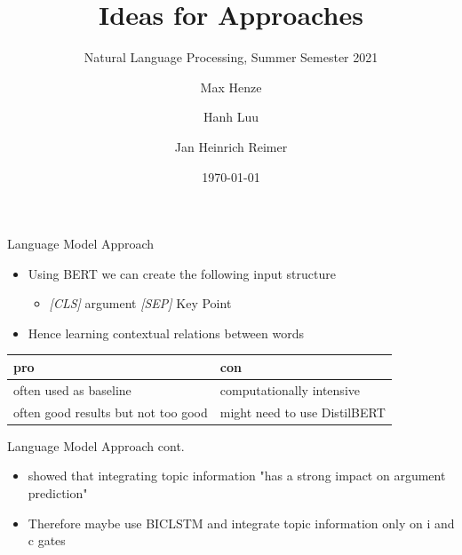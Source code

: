 \documentclass[english,handout]{mlutalk}
\title{Ideas for Approaches}
\subtitle{Natural Language Processing, Summer Semester 2021}
\author{Max Henze \and Hanh Luu \and Jan Heinrich Reimer}
\institute{Martin Luther University Halle-Wittenberg}
\date{\today}
\begin{document}
\titleframe


\begin{frame}{Language Model Approach}
  
  \begin{itemize}
    \item Using BERT we can create the following input structure\\
      \begin{itemize}
        \item \textit{[CLS]} argument \textit{[SEP]} Key Point
      \end{itemize}
    \item Hence learning contextual relations between words
  \end{itemize}

  \begin{tabular}{ll}
    \toprule
      pro & con \\
    \midrule
      often used as baseline & computationally intensive \\
      often good results but not too good & might need to use DistilBERT\\
    \bottomrule
  \end{tabular}

\end{frame}

\begin{frame}{Language Model Approach cont.}
  
    \begin{itemize}
      \item \cite{StabMSRG2018} showed that integrating topic information "has a strong impact on argument prediction"
      \item Therefore maybe use BICLSTM and integrate topic information only on i and c gates
    \end{itemize}
  
\end{frame}
\end{document}
